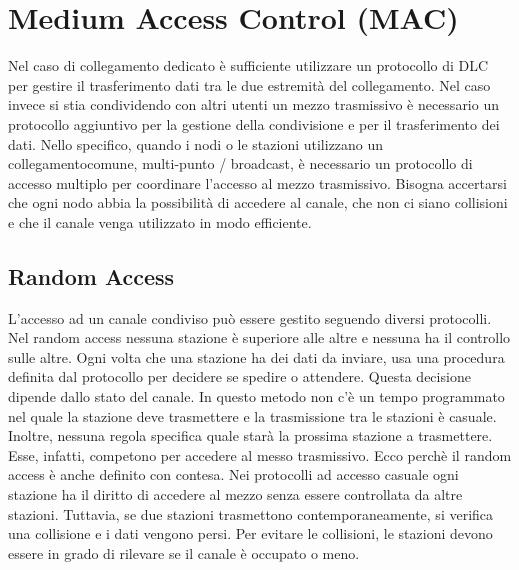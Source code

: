 \documentclass[12pt]{report}
\begin{document}
\section{Medium Access Control (MAC)}
Nel caso di collegamento dedicato è sufficiente utilizzare un protocollo di DLC per gestire il trasferimento dati tra le due estremità del collegamento. Nel caso invece si stia condividendo con altri utenti un mezzo trasmissivo è necessario un protocollo aggiuntivo per la gestione della condivisione e per il trasferimento dei dati. Nello specifico, quando i nodi o le stazioni utilizzano un collegamentocomune, multi-punto / broadcast, è necessario un protocollo di accesso multiplo per coordinare l'accesso al mezzo trasmissivo. Bisogna accertarsi che ogni nodo abbia la possibilità di accedere al canale, che non ci siano collisioni e che il canale venga utilizzato in modo efficiente. 

\subsection{Random Access}
L'accesso ad un canale condiviso può essere gestito seguendo diversi protocolli. Nel random access nessuna stazione è superiore alle altre e nessuna ha il controllo sulle altre. Ogni volta che una stazione ha dei dati da inviare, usa una procedura definita dal protocollo per decidere se spedire o attendere. Questa decisione dipende dallo stato del canale. In questo metodo non c'è un tempo programmato nel quale la stazione deve trasmettere e la trasmissione tra le stazioni è casuale. Inoltre, nessuna regola specifica quale starà la prossima stazione a trasmettere. Esse, infatti, competono per accedere al messo trasmissivo. Ecco perchè il random access è anche definito con contesa. Nei protocolli ad accesso casuale ogni stazione ha il diritto di accedere al mezzo senza essere controllata da altre stazioni. Tuttavia, se due stazioni trasmettono contemporaneamente, si verifica una collisione e i dati vengono persi. Per evitare le collisioni, le stazioni devono essere in grado di rilevare se il canale è occupato o meno.
\end{document}
